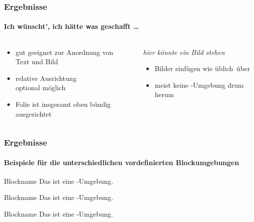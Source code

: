 \documentclass[utf8]{beamer}
\begin{document}
\begin{frame}[t]
\frametitle{Ergebnisse}
\framesubtitle{Ich wünscht', ich hätte was geschafft \ldots}

\begin{columns}[T]
\begin{column}{.45\textwidth}

\begin{itemize}
\item gut geeignet zur Anordnung von\\ Text und Bild
\item relative Ausrichtung\\ optional möglich
\item Folie ist insgesamt oben bündig ausgerichtet
\end{itemize}

\end{column}
%
\begin{column}{.45\textwidth}

\vspace*{1ex}

\emph{hier könnte ein Bild stehen}

\begin{itemize}
\item Bilder einfügen wie üblich über 
\item meist keine -Umgebung drum herum
\end{itemize}

\end{column}
\end{columns}

\end{frame}


\begin{frame}
\frametitle{Ergebnisse}
\framesubtitle{Beispiele für die unterschiedlichen vordefinierten Blockumgebungen}

\begin{block}{Blockname}
Das ist eine -Umgebung.
\end{block}

\begin{alertblock}{Blockname}
Das ist eine -Umgebung.
\end{alertblock}

\begin{exampleblock}{Blockname}
Das ist eine -Umgebung.
\end{exampleblock}

\end{frame}
\end{document}
